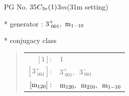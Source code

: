 \documentclass[fleqn,8pt]{jsarticle}
\begin{document}
\setcounter{MaxMatrixCols}{32}

\renewcommand{\tablename}{Table~}
\renewcommand{\figurename}{Figure~}
\begin{center}
\LARGE
PG No. 35\quad$C_{\rm 3v}(1)$\quad$3m$\quad(31m setting)\quad[ trigonal ]
\end{center}

* generator : $3^{+}_{\,\,001},\,\,{\rm m}_{1-10}$

* conjugacy class
\begin{quote}
\begin{tabular}{rl}
$ [1]: $ & $ 1 $ \\
$ [3^{+}_{\,\,001}]: $ & $ 3^{+}_{\,\,001},\,\,\,3^{-}_{\,\,001} $ \\
$ [{\rm m}_{120}]: $ & $ {\rm m}_{120},\,\,\,{\rm m}_{210},\,\,\,{\rm m}_{1-10} $
\end{tabular}
\end{quote}
\end{document}
